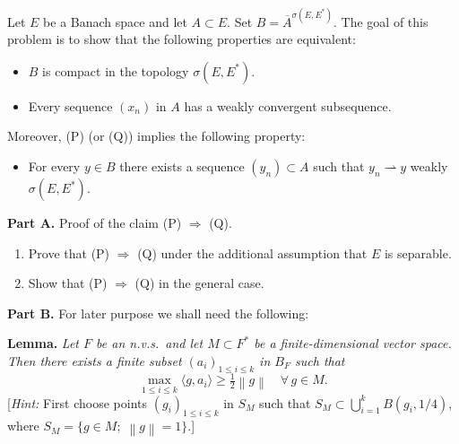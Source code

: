 \documentclass[12pt]{article}
\newcommand{\norm}[1]{\left\|#1\right\|}
\newcommand{\abs}[1]{\left|#1\right|}
\newcommand{\ip}[2]{\langle #1, #2 \rangle}
\begin{document}
\medskip

Let $E$ be a Banach space and let $A \subset E$. Set $B = \overline{A}^{\sigma(E,E^*)}$.
The goal of this problem is to show that the following properties are equivalent:
\begin{itemize}
\item[(P)] $B$ is compact in the topology $\sigma(E, E^*)$.
\item[(Q)] Every sequence $(x_n)$ in $A$ has a weakly convergent subsequence.
\end{itemize}
Moreover, (P) (or (Q)) implies the following property:
\begin{itemize}
\item[(R)] For every $y \in B$ there exists a sequence $(y_n) \subset A$ such that $y_n \rightharpoonup y$
weakly $\sigma(E, E^*)$.
\end{itemize}

\noindent\textbf{Part A.} Proof of the claim (P) $\Rightarrow$ (Q).

\begin{enumerate}
\item Prove that (P) $\Rightarrow$ (Q) under the additional assumption that $E$ is separable.

\noindent[\textit{Hint:} Consider a set $(b_k)$ in $B_{E^*}$ that is countable and dense in $B_{E^*}$ for the
topology $\sigma(E^*, E)$ (why does such a set exist?). Check that the quantity
$d(x,y) = \sum_{k=1}^\infty \frac{1}{2^k}\abs{\ip{b_k}{x-y}}$ is a metric and deduce that $B$ is metrizable for $\sigma(E,E^*)$.]

\item Show that (P) $\Rightarrow$ (Q) in the general case.

\end{enumerate}

\noindent\textbf{Part B.} For later purpose we shall need the following:

\medskip

\noindent\textbf{Lemma.} \textit{Let $F$ be an n.v.s.\ and let $M \subset F^*$ be a finite-dimensional vector space.
Then there exists a finite subset $(a_i)_{1 \le i \le k}$ in $B_F$ such that}
\[
\max_{1 \le i \le k} \ip{g}{a_i} \ge \tfrac{1}{2}\norm{g} \quad \forall\, g \in M.
\]
[\textit{Hint:} First choose points $(g_i)_{1 \le i \le k}$ in $S_M$ such that $S_M \subset \bigcup_{i=1}^k B(g_i, 1/4)$,
where $S_M = \{g \in M;\; \norm{g} = 1\}$.]

\medskip
\end{document}

